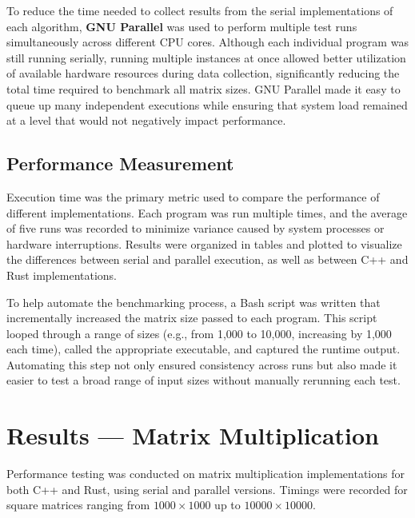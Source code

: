 \documentclass[12pt]{article}
\begin{document}
To reduce the time needed to collect results from the serial implementations of each algorithm, \textbf{GNU Parallel} was used to perform multiple test runs
simultaneously across different CPU cores. Although each individual program was still running serially, running multiple instances at once allowed better
utilization of available hardware resources during data collection, significantly reducing the total time required to benchmark all matrix sizes.
GNU Parallel made it easy to queue up many independent executions while ensuring that system load remained at a level that would not negatively impact performance.

\subsection{Performance Measurement}

Execution time was the primary metric used to compare the performance of different implementations. Each program was run multiple times, and the average
of five runs was recorded to minimize variance caused by system processes or hardware interruptions. Results were organized in tables and plotted to visualize
the differences between serial and parallel execution, as well as between C++ and Rust implementations.

To help automate the benchmarking process, a Bash script was written that incrementally increased the matrix size passed to each program. This script looped
through a range of sizes (e.g., from 1,000 to 10,000, increasing by 1,000 each time), called the appropriate executable, and captured the runtime output.
Automating this step not only ensured consistency across runs but also made it easier to test a broad range of input sizes without manually rerunning
each test.

\section{Results --- Matrix Multiplication}
Performance testing was conducted on matrix multiplication implementations for both C++ and Rust, using serial and parallel versions.
Timings were recorded for square matrices ranging from \(1000 \times 1000\) up to \(10000 \times 10000\).
\end{document}
